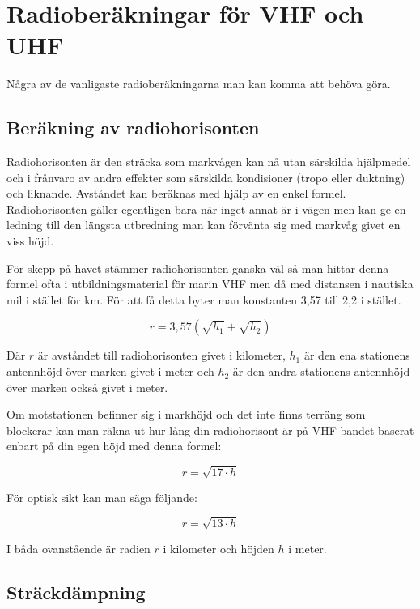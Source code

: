 \section{Radioberäkningar för VHF och UHF}

Några av de vanligaste radioberäkningarna man kan komma att behöva göra.

\subsection{Beräkning av radiohorisonten}

Radiohorisonten är den sträcka som markvågen kan nå utan särskilda hjälpmedel
och i frånvaro av andra effekter som särskilda kondisioner (tropo eller
duktning) och liknande. Avståndet kan beräknas med hjälp av en enkel formel.
Radiohorisonten gäller egentligen bara när inget annat är i vägen men kan ge
en ledning till den längsta utbredning man kan förvänta sig med markvåg givet
en viss höjd.

För skepp på havet stämmer radiohorisonten ganska väl så man hittar denna
formel ofta i utbildningsmaterial för marin VHF men då med distansen i
nautiska mil i stället för km. För att få detta byter man konstanten 3,57 till
2,2 i stället.

\begin{equation}
	r = 3,57 \left(\sqrt{h_1}+\sqrt{h_2}\right)
\end{equation}

Där $r$ är avståndet till radiohorisonten givet i kilometer, $h_1$ är den ena
stationens antennhöjd över marken givet i meter och $h_2$ är den andra
stationens antennhöjd över marken också givet i meter.

Om motstationen befinner sig i markhöjd och det inte finns terräng som
blockerar kan man räkna ut hur lång din radiohorisont är på VHF-bandet baserat
enbart på din egen höjd med denna formel:

\begin{equation}
	r = \sqrt{17 \cdot h}
\end{equation}

För optisk sikt kan man säga följande:

\begin{equation}
	r = \sqrt{13 \cdot h}
\end{equation}

I båda ovanstående är radien $r$ i kilometer och höjden $h$ i meter.

\subsection{Sträckdämpning}

